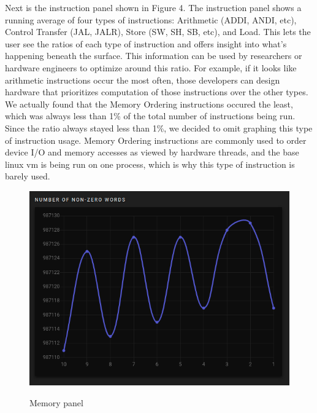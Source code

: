 Next is the instruction panel shown in Figure 4. The instruction panel shows a running average of four types of instructions:
Arithmetic (ADDI, ANDI, etc), Control Transfer (JAL, JALR), Store (SW, SH, SB, etc), and Load. 
This lets the user see the ratios of each type of instruction and offers 
insight into what's happening beneath the surface. This information can be used by researchers or hardware engineers to
optimize around this ratio. For example, if it looks like arithmetic instructions occur the most often, those developers can design
hardware that prioritizes computation of those instructions over the other types. We actually found that the Memory Ordering 
instructions occured the least, which was always less than 1\% of the total number of instructions being run. Since the ratio
always stayed less than 1\%, we decided to omit graphing this type of instruction usage. Memory Ordering instructions are commonly
used to order device I/O and memory accesses as viewed by hardware threads, and the base linux vm is being run on one process,
which is why this type of instruction is barely used.

\begin{figure}[H]
  \includegraphics[scale=.4]{mem}
  \label{fig:mem}
  \caption{Memory panel}
  \centering
\end{figure}

\noindent

